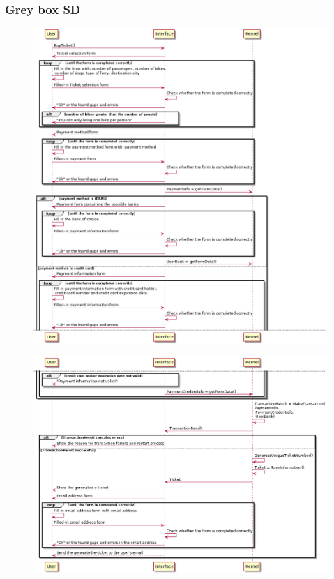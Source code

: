 \subsubsection{Grey box SD}
\creator{\studentC}
\updater{\studentA}
\begin{figure}[H]
\includegraphics[scale=0.5]{Iteration_3/Files/UC1_gb1.png}
\end{figure}
\begin{figure}[H]
\includegraphics[scale=0.5]{Iteration_3/Files/UC1_gb2.png}
\end{figure}
